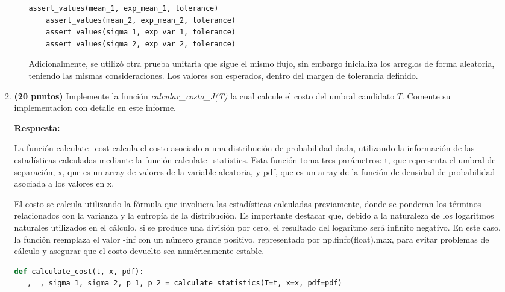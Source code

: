 \documentclass[spanish]{article}
\begin{document}
\begin{enumerate}
\begin{enumerate}
\begin{enumerate}
\begin{lstlisting}[language=Python, caption=Pruebas Unitarias]
    assert_values(mean_1, exp_mean_1, tolerance)
    assert_values(mean_2, exp_mean_2, tolerance)
    assert_values(sigma_1, exp_var_1, tolerance)
    assert_values(sigma_2, exp_var_2, tolerance)
\end{lstlisting}
\vspace{5px}

\par Adicionalmente, se utilizó otra prueba unitaria que sigue el mismo flujo, sin embargo inicializa los arreglos de forma aleatoria, teniendo las mismas consideraciones. Los valores son esperados, dentro del margen de tolerancia definido.



 \newpage
\end{enumerate}
\item \textbf{(20 puntos)} Implemente la función \emph{calcular\_costo\_J(T)
}la cual calcule el costo del umbral candidato $T$. Comente su implementacion
con detalle en este informe. 
\vspace{5px}

\par \textbf{Respuesta:}
\vspace{5px}

\par La función calculate\_cost calcula el costo asociado a una distribución de probabilidad dada, utilizando la información de las estadísticas calculadas mediante la función calculate\_statistics. Esta función toma tres parámetros: t, que representa el umbral de separación, x, que es un array de valores de la variable aleatoria, y pdf, que es un array de la función de densidad de probabilidad asociada a los valores en x.

El costo se calcula utilizando la fórmula que involucra las estadísticas calculadas previamente, donde se ponderan los términos relacionados con la varianza y la entropía de la distribución. Es importante destacar que, debido a la naturaleza de los logaritmos naturales utilizados en el cálculo, si se produce una división por cero, el resultado del logaritmo será infinito negativo. En este caso, la función reemplaza el valor -inf con un número grande positivo, representado por np.finfo(float).max, para evitar problemas de cálculo y asegurar que el costo devuelto sea numéricamente estable.

\begin{lstlisting}[language=Python, caption=Calculo de Costos]
def calculate_cost(t, x, pdf):
  _, _, sigma_1, sigma_2, p_1, p_2 = calculate_statistics(T=t, x=x, pdf=pdf)


\end{lstlisting}
\end{enumerate}
\end{enumerate}
\end{document}
